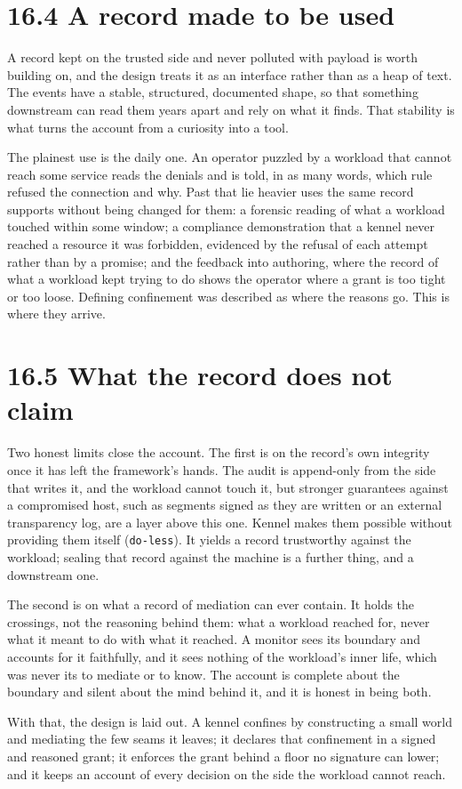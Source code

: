 \hypertarget{a-record-made-to-be-used}{%
\section{16.4 A record made to be used}\label{a-record-made-to-be-used}}

A record kept on the trusted side and never polluted with payload is
worth building on, and the design treats it as an interface rather than
as a heap of text. The events have a stable, structured, documented
shape, so that something downstream can read them years apart and rely
on what it finds. That stability is what turns the account from a
curiosity into a tool.

The plainest use is the daily one. An operator puzzled by a workload
that cannot reach some service reads the denials and is told, in as many
words, which rule refused the connection and why. Past that lie heavier
uses the same record supports without being changed for them: a forensic
reading of what a workload touched within some window; a compliance
demonstration that a kennel never reached a resource it was forbidden,
evidenced by the refusal of each attempt rather than by a promise; and
the feedback into authoring, where the record of what a workload kept
trying to do shows the operator where a grant is too tight or too loose.
Defining confinement was described as where the reasons go. This is
where they arrive.

\hypertarget{what-the-record-does-not-claim}{%
\section{16.5 What the record does not
claim}\label{what-the-record-does-not-claim}}

Two honest limits close the account. The first is on the record's own
integrity once it has left the framework's hands. The audit is
append-only from the side that writes it, and the workload cannot touch
it, but stronger guarantees against a compromised host, such as segments
signed as they are written or an external transparency log, are a layer
above this one. Kennel makes them possible without providing them itself
(\texttt{do-less}). It yields a record trustworthy against the workload;
sealing that record against the machine is a further thing, and a
downstream one.

The second is on what a record of mediation can ever contain. It holds
the crossings, not the reasoning behind them: what a workload reached
for, never what it meant to do with what it reached. A monitor sees its
boundary and accounts for it faithfully, and it sees nothing of the
workload's inner life, which was never its to mediate or to know. The
account is complete about the boundary and silent about the mind behind
it, and it is honest in being both.

With that, the design is laid out. A kennel confines by constructing a
small world and mediating the few seams it leaves; it declares that
confinement in a signed and reasoned grant; it enforces the grant behind
a floor no signature can lower; and it keeps an account of every
decision on the side the workload cannot reach.
